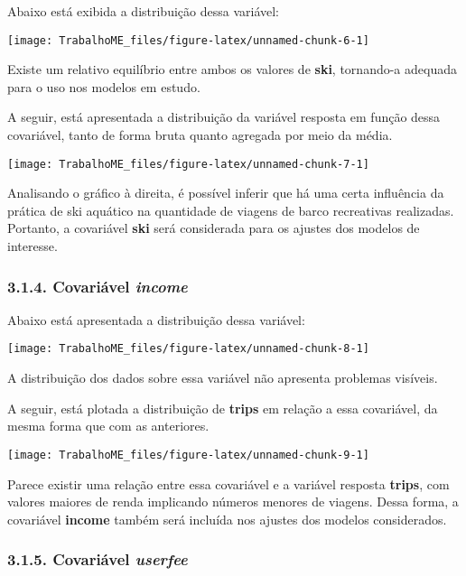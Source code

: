 \documentclass[
]{article}
\begin{document}
Abaixo está exibida a distribuição dessa variável:

\begin{center}\texttt{[image: TrabalhoME\_files/figure-latex/unnamed-chunk-6-1]} \end{center}

Existe um relativo equilíbrio entre ambos os valores de \textbf{ski},
tornando-a adequada para o uso nos modelos em estudo.

A seguir, está apresentada a distribuição da variável resposta em função
dessa covariável, tanto de forma bruta quanto agregada por meio da
média.

\begin{center}\texttt{[image: TrabalhoME\_files/figure-latex/unnamed-chunk-7-1]} \end{center}

Analisando o gráfico à direita, é possível inferir que há uma certa
influência da prática de ski aquático na quantidade de viagens de barco
recreativas realizadas. Portanto, a covariável \textbf{ski} será
considerada para os ajustes dos modelos de interesse.

\subsubsection{\texorpdfstring{3.1.4. Covariável
\emph{income}}{3.1.4. Covariável income}}\label{covariuxe1vel-income}

Abaixo está apresentada a distribuição dessa variável:

\begin{center}\texttt{[image: TrabalhoME\_files/figure-latex/unnamed-chunk-8-1]} \end{center}

A distribuição dos dados sobre essa variável não apresenta problemas
visíveis.

A seguir, está plotada a distribuição de \textbf{trips} em relação a
essa covariável, da mesma forma que com as anteriores.

\begin{center}\texttt{[image: TrabalhoME\_files/figure-latex/unnamed-chunk-9-1]} \end{center}

Parece existir uma relação entre essa covariável e a variável resposta
\textbf{trips}, com valores maiores de renda implicando números menores
de viagens. Dessa forma, a covariável \textbf{income} também será
incluída nos ajustes dos modelos considerados.

\subsubsection{\texorpdfstring{3.1.5. Covariável
\emph{userfee}}{3.1.5. Covariável userfee}}\label{covariuxe1vel-userfee}
\end{document}
